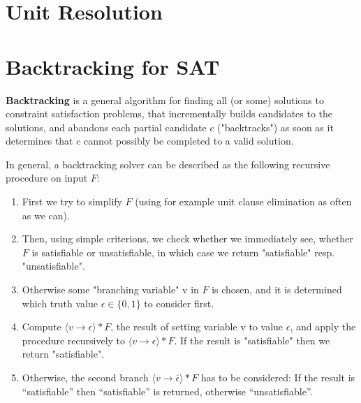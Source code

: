 \documentclass[12pt]{book}
\begin{document}
\section{Unit Resolution}
\label{sec:Unit Resolution}
\section{Backtracking for SAT}
\label{sec:Backtracking for SAT}
\begin{defi}\label{def:bsat} \textbf{Backtracking} is a general algorithm for finding all (or some) solutions to constraint satisfaction problems, 
that incrementally builds candidates to the solutions, and abandons each partial candidate $c$ ("backtracks") as soon as it determines that c cannot 
possibly be completed to a valid solution. 

In general, a backtracking solver can be described as the following recursive procedure on input $F$:
\begin{enumerate}
\item First we try to simplify $F$ (using for example unit clause elimination as often as we can).
\item Then, using simple criterions, we check whether we immediately see, whether $F$ is satisfiable or
unsatisfiable, in which case we return "satisfiable" resp. "unsatisfiable".
\item Otherwise some "branching variable" v in $F$ is chosen, and it is determined which truth value $\epsilon \in \{ 0, 1\}$ to consider first.
\item Compute $\langle v \to \epsilon \rangle * F$, the result of setting variable v to value $\epsilon$, and apply the procedure recursively to
$\langle v \to \epsilon \rangle * F$. If the result is "satisfiable" then we return "satisfiable".
\item Otherwise, the second branch $\langle v \to \overline{\epsilon} \rangle * F$ has to be considered: If the result is “satisfiable” then
“satisfiable” is returned, otherwise “unsatisfiable”.
\end{enumerate}
\end{defi}
\end{document}
